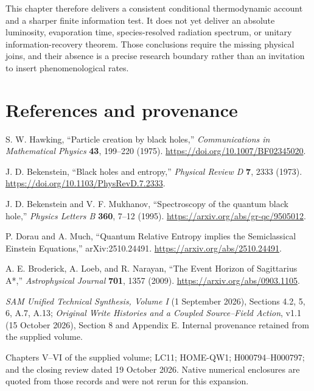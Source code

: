 This chapter therefore delivers a consistent conditional thermodynamic account and a sharper finite information test. It does not yet deliver an absolute luminosity, evaporation time, species-resolved radiation spectrum, or unitary information-recovery theorem. Those conclusions require the missing physical joins, and their absence is a precise research boundary rather than an invitation to insert phenomenological rates.

\section*{References and provenance}
\begingroup\small
\begin{enumerate}[label={[VII.\arabic*]},leftmargin=*]
\item S. W. Hawking, ``Particle creation by black holes,'' \emph{Communications in Mathematical Physics} \textbf{43}, 199--220 (1975). \url{https://doi.org/10.1007/BF02345020}.
\item J. D. Bekenstein, ``Black holes and entropy,'' \emph{Physical Review D} \textbf{7}, 2333 (1973). \url{https://doi.org/10.1103/PhysRevD.7.2333}.
\item J. D. Bekenstein and V. F. Mukhanov, ``Spectroscopy of the quantum black hole,'' \emph{Physics Letters B} \textbf{360}, 7--12 (1995). \url{https://arxiv.org/abs/gr-qc/9505012}.
\item P. Dorau and A. Much, ``Quantum Relative Entropy implies the Semiclassical Einstein Equations,'' arXiv:2510.24491. \url{https://arxiv.org/abs/2510.24491}.
\item A. E. Broderick, A. Loeb, and R. Narayan, ``The Event Horizon of Sagittarius A*,'' \emph{Astrophysical Journal} \textbf{701}, 1357 (2009). \url{https://arxiv.org/abs/0903.1105}.
\item \emph{SAM Unified Technical Synthesis, Volume I} (1 September 2026), Sections 4.2, 5, 6, A.7, A.13; \emph{Original Write Histories and a Coupled Source--Field Action}, v1.1 (15 October 2026), Section 8 and Appendix E. Internal provenance retained from the supplied volume.
\item Chapters V--VI of the supplied volume; LC11; HOME-QW1; H000794--H000797; and the closing review dated 19 October 2026. Native numerical enclosures are quoted from those records and were not rerun for this expansion.
\end{enumerate}
\endgroup
